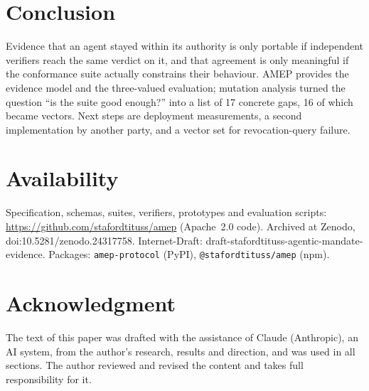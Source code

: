 \documentclass[conference]{IEEEtran}
\newcommand{\code}[1]{\texttt{\small #1}}
\begin{document}
\section{Conclusion}

Evidence that an agent stayed within its authority is only portable if independent verifiers reach the same verdict on it, and that agreement is only meaningful if the conformance suite actually constrains their behaviour. AMEP provides the evidence model and the three-valued evaluation; mutation analysis turned the question ``is the suite good enough?'' into a list of 17 concrete gaps, 16 of which became vectors. Next steps are deployment measurements, a second implementation by another party, and a vector set for revocation-query failure.

\section*{Availability}
Specification, schemas, suites, verifiers, prototypes and evaluation scripts: \url{https://github.com/stafordtituss/amep} (Apache~2.0 code). Archived at Zenodo, doi:10.5281/zenodo.24317758. Internet-Draft: draft-stafordtituss-agentic-mandate-evidence. Packages: \code{amep-protocol} (PyPI), \code{@stafordtituss/amep} (npm).

\section*{Acknowledgment}
The text of this paper was drafted with the assistance of Claude (Anthropic), an AI system, from the author's research, results and direction, and was used in all sections. The author reviewed and revised the content and takes full responsibility for it.
\end{document}
